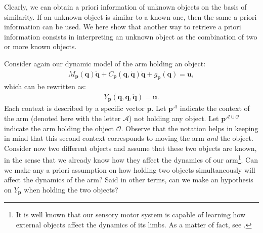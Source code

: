 \documentclass{svmult}
\begin{document}
Clearly, we can obtain a priori information of unknown objects on
the basis of similarity. If an unknown object is similar to a known
one, then the same a priori information can be used. We here show
that another way to retrieve a priori information consists in
interpreting an unknown object as the combination of two or more
known objects.

Consider again our dynamic model of the arm holding an object:
\begin{eqnarray}
M_{\mathbf p}(\mathbf{q}) \ddot{\mathbf{q}} + C_{\mathbf
p}(\mathbf{q},\dot{\mathbf{q}})\dot{\mathbf{q}} + g_{\mathbf
p}(\mathbf{q}) = \mathbf u,
\end{eqnarray}
which can be rewritten as:
\begin{eqnarray} \label{Eq:DynMod}
Y_{\mathbf p}(\mathbf q, \dot{\mathbf q}, \ddot{\mathbf q}) =
\mathbf u.
\end{eqnarray}
Each context is described by a specific vector $\mathbf p$. Let
$\mathbf p^{\mathcal A}$ indicate the context of the arm (denoted
here with the letter $\mathcal A$) not holding any object. Let
$\mathbf p^{\mathcal A \cup \mathcal O}$ indicate the arm holding
the object $\mathcal O$. Observe that the notation helps in keeping
in mind that this second context corresponds to moving the arm {\em
and} the object. Consider now two different objects and assume that
these two objects are known, in the sense that we already know how
they affect the dynamics of our arm\footnote{It is well known that
our sensory motor system is capable of learning how external objects
affect the dynamics of its limbs. As a matter of fact, see
\cite{Shadmehr}.}. Can we make any a priori assumption on how
holding two objects simultaneously will affect the dynamics of the
arm? Said in other terms, can we make an hypothesis on $Y_{\mathbf
p}$ when holding the two objects?
\end{document}
